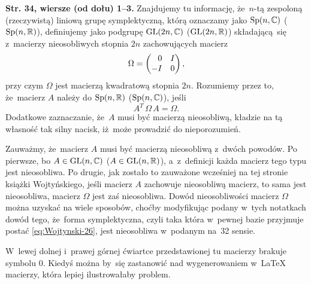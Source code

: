 \documentclass[a4paper,11pt]{article}
\begin{document}
\noindent
\textbf{Str. 34, wiersze (od dołu) 1--3.} Znajdujemy tu informację,
że~$n$-tą zespoloną (rzeczywistą) liniową grupę symplektyczną, którą
oznaczamy jako $\mathrm{Sp}( n, \mathbb{C} )$ ($\mathrm{Sp}( n, \mathbb{R} )$), definiujemy
jako podgrupę $\mathrm{GL}( 2n, \mathbb{C} )$ ($\mathrm{GL}( 2n, \mathbb{R} )$) składającą~się
z~macierzy nieosobliwych stopnia $2n$ zachowujących macierz
\begin{equation}
  \label{eq:Wojtynski-28}
  \Omega =
  \begin{pmatrix}
    \hphantom{-} 0 & I \\
    -I & 0
  \end{pmatrix},
\end{equation}
przy czym $\Omega$ jest macierzą kwadratową stopnia $2n$. Rozumiemy przez to,
że~macierz $A$ należy do $\mathrm{Sp}( n, \mathbb{R} )$ ($\mathrm{Sp}( n, \mathbb{C} )$), jeśli
\begin{equation}
  \label{eq:Wojtynski-29}
  A^{ T } \, \Omega \, A = \Omega.
\end{equation}
Dodatkowe zaznaczanie, że~$A$ musi być macierzą nieosobliwą, kładzie na tą
własność tak silny nacisk, iż~może prowadzić do nieporozumień.

Zauważmy, że~macierz $A$ musi być macierzą nieosobliwą z~dwóch powodów. Po
pierwsze, bo $A \in \mathrm{GL}( n, \mathbb{C})$ ($A \in \mathrm{GL}( n, \mathbb{R} )$), a~z~definicji
każda macierz tego typu jest nieosobliwa. Po drugie, jak zostało to
zauważone wcześniej na tej stronie książki Wojtyńskiego, jeśli macierz $A$
zachowuje nieosobliwą macierz, to sama jest nieosobliwa, macierz $\Omega$ jest
zaś nieosobliwa. Dowód nieosobliwości macierz $\Omega$ można uzyskać na wiele
sposobów, choćby modyfikując podany w~tych notatkach dowód tego, że~forma
symplektyczna, czyli taka która w~pewnej bazie przyjmuje postać
\eqref{eq:Wojtynski-26}, jest nieosobliwa w~podanym na~32 sensie.

\vspace{\spaceFour}





 W~lewej dolnej i~prawej górnej ćwiartce przedstawionej tu
macierzy brakuje symbolu $0$. Kiedyś można by~się zastanowić nad
wygenerowaniem w~\LaTeX{} macierzy, która lepiej ilustrowałaby problem.

\vspace{\spaceFour}
\end{document}
